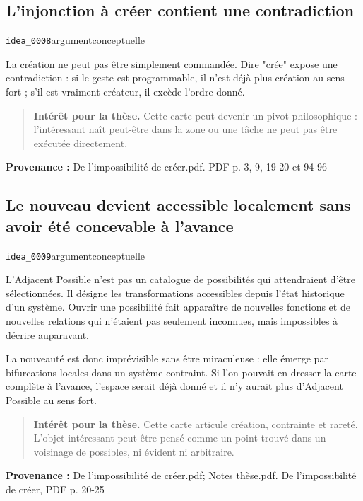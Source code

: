 \documentclass[10pt,a4paper]{article}
\begin{document}
\subsection{L'injonction à créer contient une contradiction}
{\small\color{metadata} \texttt{idea\_0008}\quad\textbullet\quad argument\quad\textbullet\quad conceptuelle\par}

La création ne peut pas être simplement commandée. Dire "crée" expose une contradiction : si le geste est programmable, il n'est déjà plus création au sens fort ; s'il est vraiment créateur, il excède l'ordre donné.

\begin{quote}
\textbf{Intérêt pour la thèse.} Cette carte peut devenir un pivot philosophique : l'intéressant naît peut-être dans la zone ou une tâche ne peut pas être exécutée directement.
\end{quote}
{\footnotesize\color{metadata}\textbf{Provenance :} De l'impossibilité de créer.pdf. PDF p. 3, 9, 19-20 et 94-96\par}

\subsection{Le nouveau devient accessible localement sans avoir été concevable à l'avance}
{\small\color{metadata} \texttt{idea\_0009}\quad\textbullet\quad argument\quad\textbullet\quad conceptuelle\par}

L'Adjacent Possible n'est pas un catalogue de possibilités qui attendraient d'être sélectionnées. Il désigne les transformations accessibles depuis l'état historique d'un système. Ouvrir une possibilité fait apparaître de nouvelles fonctions et de nouvelles relations qui n'étaient pas seulement inconnues, mais impossibles à décrire auparavant.

La nouveauté est donc imprévisible sans être miraculeuse : elle émerge par bifurcations locales dans un système contraint. Si l'on pouvait en dresser la carte complète à l'avance, l'espace serait déjà donné et il n'y aurait plus d'Adjacent Possible au sens fort.

\begin{quote}
\textbf{Intérêt pour la thèse.} Cette carte articule création, contrainte et rareté. L'objet intéressant peut être pensé comme un point trouvé dans un voisinage de possibles, ni évident ni arbitraire.
\end{quote}
{\footnotesize\color{metadata}\textbf{Provenance :} De l'impossibilité de créer.pdf; Notes thèse.pdf. De l'impossibilité de créer, PDF p. 20-25\par}
\end{document}
